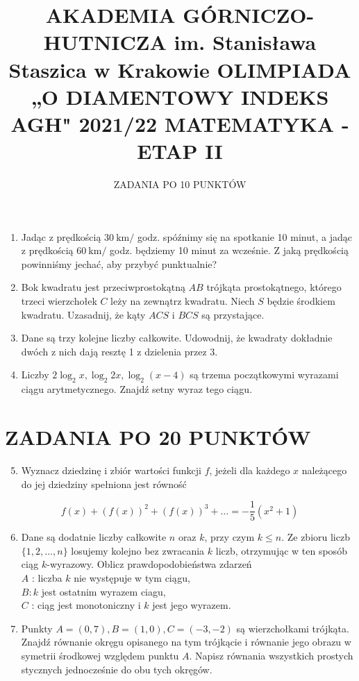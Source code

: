 \documentclass[10pt]{article}
\title{AKADEMIA GÓRNICZO-HUTNICZA im. Stanisława Staszica w Krakowie OLIMPIADA „O DIAMENTOWY INDEKS AGH" 2021/22 MATEMATYKA - ETAP II }
\author{ZADANIA PO 10 PUNKTÓW}
\date{}
\begin{document}
\maketitle


\begin{enumerate}
  \item Jadąc z prędkością $30 \mathrm{~km} /$ godz. spóźnimy się na spotkanie 10 minut, a jadąc z prędkością $60 \mathrm{~km} /$ godz. będziemy 10 minut za wcześnie. Z jaką prędkością powinniśmy jechać, aby przybyć punktualnie?
  \item Bok kwadratu jest przeciwprostokątną $A B$ trójkąta prostokątnego, którego trzeci wierzchołek $C$ leży na zewnątrz kwadratu. Niech $S$ będzie środkiem kwadratu. Uzasadnij, że kąty $A C S$ i $B C S$ są przystające.
  \item Dane są trzy kolejne liczby całkowite. Udowodnij, że kwadraty dokładnie dwóch z nich dają resztę 1 z dzielenia przez 3.
  \item Liczby $2 \log _{2} x, \log _{2} 2 x, \log _{2}(x-4)$ są trzema początkowymi wyrazami ciągu arytmetycznego. Znajdź setny wyraz tego ciągu.
\end{enumerate}

\section*{ZADANIA PO 20 PUNKTÓW}
\begin{enumerate}
  \setcounter{enumi}{4}
  \item Wyznacz dziedzinę i zbiór wartości funkcji $f$, jeżeli dla każdego $x$ należącego do jej dziedziny spełniona jest równość
\end{enumerate}

$$
f(x)+(f(x))^{2}+(f(x))^{3}+\ldots=-\frac{1}{5}\left(x^{2}+1\right)
$$

\begin{enumerate}
  \setcounter{enumi}{5}
  \item Dane są dodatnie liczby całkowite $n$ oraz $k$, przy czym $k \leqslant n$. Ze zbioru liczb $\{1,2, \ldots, n\}$ losujemy kolejno bez zwracania $k$ liczb, otrzymując w ten sposób ciąg $k$-wyrazowy. Oblicz prawdopodobieństwa zdarzeń\\
$A$ : liczba $k$ nie występuje w tym ciągu,\\
$B: k$ jest ostatnim wyrazem ciagu,\\
$C$ : ciąg jest monotoniczny i $k$ jest jego wyrazem.
  \item Punkty $A=(0,7), B=(1,0), C=(-3,-2)$ są wierzchołkami trójkąta. Znajdź równanie okręgu opisanego na tym trójkącie i równanie jego obrazu w symetrii środkowej względem punktu $A$. Napisz równania wszystkich prostych stycznych jednocześnie do obu tych okręgów.
\end{enumerate}
\end{document}
